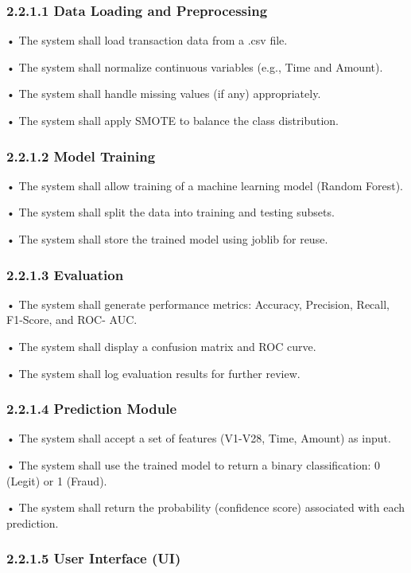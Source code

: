 \documentclass[11pt,a4paper]{article}
\begin{document}
\newpage

\subsubsection*{2.2.1.1 Data Loading and Preprocessing }

• 
The system shall load transaction data from a .csv file. 

• 
The system shall normalize continuous variables (e.g., Time and Amount). 

• 
The system shall handle missing values (if any) appropriately. 

• 
The system shall apply SMOTE to balance the class distribution. 

\subsubsection*{2.2.1.2 Model Training }

• 
The system shall allow training of a machine learning model (Random Forest). 

• 
The system shall split the data into training and testing subsets. 

• 
The system shall store the trained model using joblib for reuse. 

\subsubsection*{2.2.1.3 Evaluation }

• 
The system shall generate performance metrics: Accuracy, Precision, Recall, F1-Score, and ROC-
AUC. 

• 
The system shall display a confusion matrix and ROC curve. 

• 
The system shall log evaluation results for further review. 

\subsubsection*{2.2.1.4 Prediction Module }

• 
The system shall accept a set of features (V1-V28, Time, Amount) as input. 

• 
The system shall use the trained model to return a binary classification: 0 (Legit) or 1 (Fraud). 

• 
The system shall return the probability (confidence score) associated with each prediction. 

\subsubsection*{2.2.1.5 User Interface (UI) }
\end{document}
